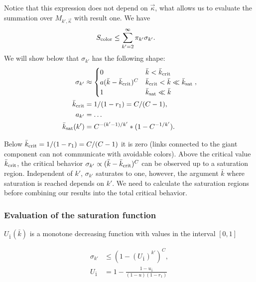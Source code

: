\documentclass[aps, pre, onecolumn, a4paper, floatfix]{revtex4}
\begin{document}
\pagebreak


Notice that this expression does not depend on $\vec \kappa$, what allows us to evaluate 
the summation over $M_{k',\vec \kappa}$ with result one. We have 
\begin{align}
S_{\rm color} &\leq \sum_{k'=2}^{\infty} \pi_{k'} \sigma_{k'}.
\end{align}
We will show below that $\sigma_{k'}$ has the following shape: 
\begin{align}
\sigma_{k'} &\approx
\begin{cases}
0 & {\bar k} < {\bar k}_{\rm crit}\\
a ({\bar k}-{\bar k}_{\rm crit})^C & {\bar k}_{\rm crit} < {\bar k} \ll {\bar k}_{\rm sat} \\
1 & {\bar k}_{\rm sat} \ll {\bar k}
\end{cases},\\
{\bar k}_{\rm crit} &= 1/(1-r_1) = C/(C-1),\\
a_{k'} &= \dots\\
{\bar k}_{\rm sat}(k') &= C^{-(k'-1)/{k'}}*(1-C^{-1/k'}).\\
\end{align}



Below 
${\bar k}_{\rm crit} = 1/(1-r_1) = C/(C-1)$ it is zero (links connected to 
the giant component can not communicate with avoidable colors). Above the critical value 
${\bar k}_{\rm crit}$, the critical behavior $\sigma_{k'}\propto ({\bar k}-{\bar k}_{\rm crit})^C$ 
can be observed up to a saturation region. Independent of $k'$, $\sigma_{k'}$ saturates to one, 
however, the argument $\bar k$ where saturation is reached depends on $k'$. We need to calculate 
the saturation regions before combining our results into the total critical behavior. 


\subsubsection{Evaluation of the saturation function}



$U_{\bar 1}(\bar k)$ is a monotone decreasing function with values in the interval 
$[0,1]$

\begin{align}
\sigma_{k'} &\leq (1-(U_{\bar 1})^{k'})^C,\\
U_{\bar 1} &= 1 - \frac{1-u_{\bar 1}}{(1-u)(1-r_1)}
\end{align}
\end{document}

